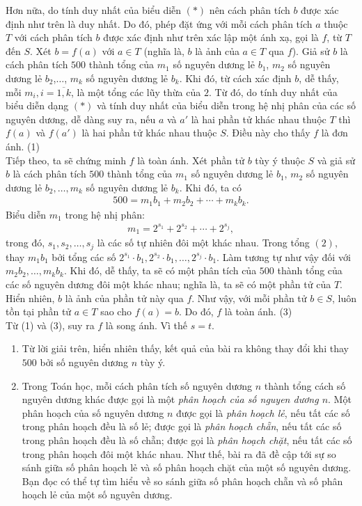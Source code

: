\begin{bt}
{		Hơn nữa, do tính duy nhất của biểu diễn $ (*) $ nên cách phân tích $ b $ được xác định như trên là duy nhất.
		Do đó, phép đặt ứng với mỗi cách phân tích $ a $ thuộc $ T $ với cách phân tích $ b $ được xác định như trên xác lập một ánh xạ, gọi là $ f $, từ $ T $ đến $ S $.
		Xét $ b=f(a) $ với $ a \in T $ (nghĩa là, $ b $ là ảnh của $ a \in T$ qua $ f $). Giả sử $ b $ là cách phân tích $500$ thành tổng của $ m_1 $ số nguyên dương lẻ $ b_1 $, $ m_2 $ số nguyên dương lẻ $ b_2$,$\dots$, $m_k $ số nguyên dương lẻ $ b_k $. Khi đó, từ cách xác định $ b $, dễ thấy, mỗi $ m_i, i=\overline{1,k} $, là một tổng các lũy thừa của $2$.
		Từ đó, do tính duy nhất của biểu diễn dạng $ (*) $ và tính duy nhất của biểu diễn trong hệ nhị phân của các số nguyên dương, dễ dàng suy ra, nếu $ a $ và $ a' $ là hai phần tử khác nhau thuộc $ T $ thì $ f(a) $ và $ f(a') $ là hai phần tử khác nhau thuộc $ S $. Điều này cho thấy $ f $ là đơn ánh. \hfill (1)\\
		Tiếp theo, ta sẽ chứng minh $ f $ là toàn ánh.
		Xét phần tử $ b $ tùy ý thuộc $ S $ và giả sử $ b $ là cách phân tích $500$ thành tổng của $ m_1 $ số nguyên dương lẻ $ b_1 $, $ m_2 $ số nguyên dương lẻ $ b_2,\dots,m_k $ số nguyên dương lẻ $ b_k $. Khi đó, ta có
		\begin{align*}
		500=m_1b_1+m_2b_2+\cdots+m_kb_k.\tag{2}
		\end{align*}
		Biểu diễn $ m_1 $ trong hệ nhị phân:
		\begin{align*}
		m_1=2^{s_1}+2^{s_2}+\cdots+2^{s_j},
		\end{align*}
		trong đó, $ s_1,s_2,\dots,s_j $ là các số tự nhiên đôi một khác nhau.
		Trong tổng $ (2)$, thay $ m_1b_1 $ bởi tổng các số $ 2^{s_1}\cdot b_1,2^{s_2}\cdot b_1,\dots, 2^{s_j}\cdot b_1 $.
		Làm tương tự như vậy đối với $ m_2b_2,\dots,m_kb_k $. 	
		Khi đó, dễ thấy, ta sẽ có một phân tích của $500$ thành tổng của các số nguyên dương đôi một khác nhau; nghĩa là, ta sẽ có một phần tử của $ T $. Hiển nhiên, $ b $ là ảnh của phần tử này qua $ f $.
		Như vậy, với mỗi phần tử $ b \in S $, luôn tồn tại phần tử $ a \in T $ sao cho $ f(a)=b $. Do đó, $ f $ là toàn ánh. \hfill (3)\\
		Từ (1) và (3), suy ra $ f $ là song ánh. Vì thế $ s=t $.
		\begin{nx}\hfill
			\begin{enumerate}
				\item Từ lời giải trên, hiển nhiên thấy, kết quả của bài ra không thay đổi khi thay $500$ bởi số nguyên dương $ n $ tùy ý.
				\item 	Trong Toán học, mỗi cách phân tích số nguyên dương $ n $ thành tổng cách số nguyên dương khác được gọi là một \textit{phân hoạch của số nguyen dương $ n $}. Một phân hoạch của số nguyên dương $ n $ được gọi là \textit{phân hoạch lẻ}, nếu tất các số trong phân hoạch đều là số lẻ; được gọi là \textit{phân hoạch chẵn}, nếu tất các số trong phân hoạch đều là số chẵn; được gọi là \textit{phân hoạch chặt}, nếu tất các số trong phân hoạch đôi một khác nhau. Như thế, bài ra đã đề cập tới sự so sánh giữa số phân hoạch lẻ và số phân hoạch chặt của một số nguyên dương. Bạn đọc có thể tự tìm hiểu về so sánh giữa số phân hoạch chẵn và số phân hoạch lẻ của một số nguyên dương. 	

\end{enumerate}
\end{nx}}
\end{bt}
